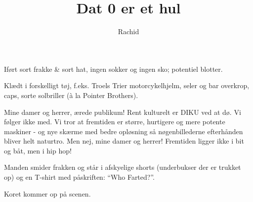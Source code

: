 \documentclass[a4paper,11pt]{article}
\title{Dat 0 er et hul}
\author{Rachid}
\begin{document}
\maketitle

\begin{roles}

Iført sort frakke \& sort hat, ingen sokker og ingen sko; potentiel blotter.

Klædt i forskelligt tøj, f.eks. Troels Trier motorcykelhjelm, seler
og bar overkrop, caps, sorte solbriller (\`a la Pointer Brothers).

\end{roles}

\begin{sketch}

Mine damer og herrer, ærede publikum! Rent kulturelt er DIKU ved at
dø. Vi følger ikke med. Vi tror at fremtiden er større, hurtigere
og mere potente maskiner - og nye skærme med bedre opløsning så
nøgenbillederne efterhånden bliver helt naturtro. Men nej, mine
damer og herrer! Fremtiden ligger ikke i bit og båt, men i hip hop!

\scene
Manden smider frakken og står i afskyelige shorts (underbukser der er
trukket op) og en T-shirt med påskriften: ``Who Farted?''.

Koret kommer op på scenen.


\end{sketch}
\end{document}
